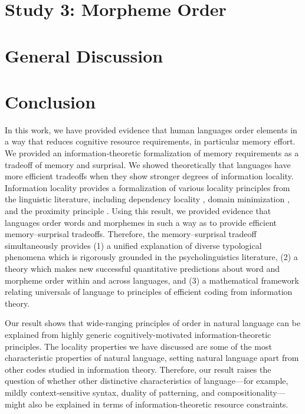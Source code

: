 \documentclass[man,floatsintext]{apa7}
\newcommand{\citep}{\parencite}
\begin{document}
\section{Study 3: Morpheme Order}\label{sec:morphemes}




\section{General Discussion}\label{sec:discussion}




\section{Conclusion}\label{sec:conclusion}

In this work, we have provided evidence that human languages order elements in a way that reduces cognitive resource requirements, in particular memory effort.
We provided an information-theoretic formalization of memory requirements as a tradeoff of memory and surprisal.
We showed theoretically that languages have more efficient tradeoffs when they show stronger degrees of information locality.
Information locality provides a formalization of various locality principles from the linguistic literature, including dependency locality \citep{gibson1998linguistic}, domain minimization \citep{hawkins2004efficiency}, and the proximity principle \citep{givon1985iconicity}.
Using this result, we provided evidence that languages order words and morphemes in such a way as to provide efficient memory--surprisal tradeoffs.
Therefore, the memory--surprisal tradeoff simultaneously provides (1) a unified explanation of diverse typological phenomena which is rigorously grounded in the psycholinguistics literature, (2) a theory which makes new successful quantitative predictions about word and morpheme order within and across languages, and (3) a mathematical framework relating universals of language to principles of efficient coding from information theory. 

Our result shows that wide-ranging principles of order in natural language can be explained from highly generic cognitively-motivated information-theoretic principles. The locality properties we have discussed are some of the most characteristic properties of natural language, setting natural language apart from other codes studied in information theory.
Therefore, our result raises the question of whether other distinctive characteristics of language---for example, mildly context-sensitive syntax, duality of patterning, and compositionality---might also be explained in terms of information-theoretic resource constraints.






\printbibliography
\end{document}
